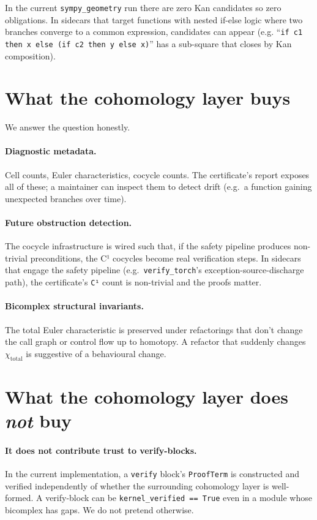 In the current \texttt{sympy\_geometry} run there are zero Kan
candidates so zero obligations.  In sidecars that target functions
with nested if-else logic where two branches converge to a common
expression, candidates can appear (e.g.
``\texttt{if c1 then x else (if c2 then y else x)}'' has a
sub-square that closes by Kan composition).

\section{What the cohomology layer buys}

We answer the question honestly.

\paragraph{Diagnostic metadata.}  Cell counts, Euler
characteristics, cocycle counts.  The certificate's report exposes
all of these; a maintainer can inspect them to detect drift (e.g.\
a function gaining unexpected branches over time).

\paragraph{Future obstruction detection.}  The cocycle
infrastructure is wired such that, if the safety pipeline produces
non-trivial preconditions, the C¹ cocycles become real verification
steps.  In sidecars that engage the safety pipeline (e.g.\
\texttt{verify\_torch}'s exception-source-discharge path), the
certificate's \texttt{C¹} count is non-trivial and the proofs
matter.

\paragraph{Bicomplex structural invariants.}  The total Euler
characteristic is preserved under refactorings that don't change the
call graph or control flow up to homotopy.  A refactor that
suddenly changes $\chi_{\text{total}}$ is suggestive of a
behavioural change.

\section{What the cohomology layer does \emph{not} buy}

\paragraph{It does not contribute trust to verify-blocks.}  In the
current implementation, a \texttt{verify} block's
\texttt{ProofTerm} is constructed and verified independently of
whether the surrounding cohomology layer is well-formed.  A
verify-block can be \texttt{kernel\_verified == True} even in a
module whose bicomplex has gaps.  We do not pretend otherwise.

